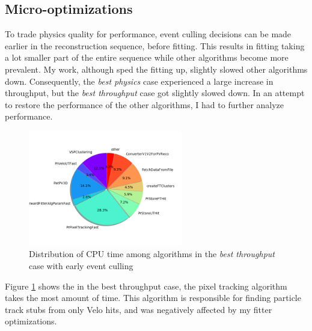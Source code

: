 \documentclass[12pt]{article}
\begin{document}
\subsection{Micro-optimizations}

To trade physics quality for performance, event culling decisions can be made earlier in the reconstruction sequence, before fitting. This results in fitting taking a lot smaller part of the entire sequence while other algorithms become more prevalent. My work, although sped the fitting up, slightly slowed other algorithms down. Consequently, the \textit{best physics} case experienced a large increase in throughput, but the \textit{best throughput} case got slightly slowed down. In an attempt to restore the performance of the other algorithms, I had to further analyze performance.

\begin{figure}[H]
	\begin{center}
		\includegraphics[width=0.6\textwidth]{algo_usage_original_bestthru}
	\end{center}
	\caption{Distribution of CPU time among algorithms in the \textit{best throughput} case with early event culling}
	\label{fig_algo_usage_original_bestthru}
\end{figure}

Figure \ref{fig_algo_usage_original_bestthru} shows the in the best throughput case, the pixel tracking algorithm takes the most amount of time. This algorithm is responsible for finding particle track stubs from only Velo hits, and was negatively affected by my fitter optimizations.
\end{document}
